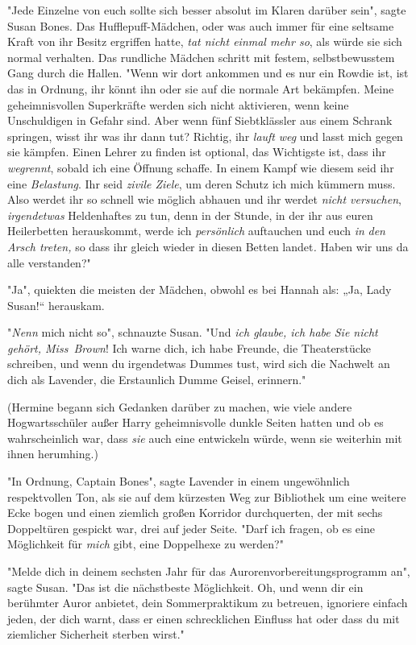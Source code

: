 {"Jede Einzelne von euch sollte sich besser absolut im Klaren darüber sein", sagte Susan Bones. Das Hufflepuff-Mädchen, oder was auch immer für eine seltsame Kraft von ihr Besitz ergriffen hatte, \emph{tat nicht einmal mehr so}, als würde sie sich normal verhalten. Das rundliche Mädchen schritt mit festem, selbstbewusstem Gang durch die Hallen. "Wenn wir dort ankommen und es nur ein Rowdie ist, ist das in Ordnung, ihr könnt ihn oder sie auf die normale Art bekämpfen. Meine geheimnisvollen Superkräfte werden sich nicht aktivieren, wenn keine Unschuldigen in Gefahr sind. Aber wenn fünf Siebtklässler aus einem Schrank springen, wisst ihr was ihr dann tut? Richtig, ihr \emph{lauft} \emph{weg} und lasst mich gegen sie kämpfen. Einen Lehrer zu finden ist optional, das Wichtigste ist, dass ihr \emph{wegrennt}, sobald ich eine Öffnung schaffe. In einem Kampf wie diesem seid ihr eine \emph{Belastung}. Ihr seid \emph{zivile Ziele}, um deren Schutz ich mich kümmern muss. Also werdet ihr so schnell wie möglich abhauen und ihr werdet \emph{nicht versuchen}, \emph{irgendetwas} Heldenhaftes zu tun, denn in der Stunde, in der ihr aus euren Heilerbetten herauskommt, werde ich \emph{persönlich} auftauchen und euch \emph{in} \emph{den Arsch treten,} so dass ihr gleich wieder in diesen Betten landet\emph{.} Haben wir uns da alle verstanden?"

"Ja", quiekten die meisten der Mädchen, obwohl es bei Hannah als: „Ja, Lady Susan!“ herauskam.

"\emph{Nenn} mich nicht so", schnauzte Susan. "Und \emph{ich glaube, ich habe Sie nicht} \emph{gehört, Miss~Brown}! Ich warne dich, ich habe Freunde, die Theaterstücke schreiben, und wenn du irgendetwas Dummes tust, wird sich die Nachwelt an dich als Lavender, die Erstaunlich Dumme Geisel, erinnern."

(Hermine begann sich Gedanken darüber zu machen, wie viele andere Hogwartsschüler außer Harry geheimnisvolle dunkle Seiten hatten und ob es wahrscheinlich war, dass \emph{sie} auch eine entwickeln würde, wenn sie weiterhin mit ihnen herumhing.)

"In Ordnung, Captain Bones", sagte Lavender in einem ungewöhnlich respektvollen Ton, als sie auf dem kürzesten Weg zur Bibliothek um eine weitere Ecke bogen und einen ziemlich großen Korridor durchquerten, der mit sechs Doppeltüren gespickt war, drei auf jeder Seite. "Darf ich fragen, ob es eine Möglichkeit für \emph{mich} gibt, eine Doppelhexe zu werden?"

"Melde dich in deinem sechsten Jahr für das Aurorenvorbereitungsprogramm an", sagte Susan. "Das ist die nächstbeste Möglichkeit. Oh, und wenn dir ein berühmter Auror anbietet, dein Sommerpraktikum zu betreuen, ignoriere einfach jeden, der dich warnt, dass er einen schrecklichen Einfluss hat oder dass du mit ziemlicher Sicherheit sterben wirst."

}
